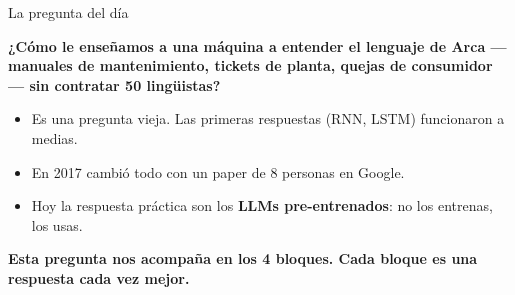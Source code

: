 \documentclass[aspectratio=169, 11pt]{beamer}
\begin{document}
\begin{frame}[shrink]{La pregunta del día}
  \vspace{14pt}
  \begin{center}
  \begin{tcolorbox}[colback=arcaDark, colframe=arcaDark, sharp corners,
    boxrule=0pt, left=14pt, right=14pt, top=10pt, bottom=10pt, width=0.92\textwidth]
    {\large\color{white}\bfseries
    ¿Cómo le enseñamos a una máquina a entender el lenguaje de Arca
    --- manuales de mantenimiento, tickets de planta, quejas de consumidor ---
    sin contratar 50 lingüistas?\par}
  \end{tcolorbox}
  \end{center}
  \vspace{14pt}
  \begin{itemize}\setlength{\itemsep}{4pt}
    \footnotesize
    \item Es una pregunta vieja. Las primeras respuestas (RNN, LSTM) funcionaron a medias.
    \item En 2017 cambió todo con un paper de 8 personas en Google.
    \item Hoy la respuesta práctica son los \textbf{LLMs pre-entrenados}: no los entrenas, los usas.
  \end{itemize}
  \vspace{6pt}
  \begin{tcolorbox}[colback=arcaRed!8, colframe=arcaRed, leftrule=3pt,
    boxrule=0pt, sharp corners, left=8pt, right=8pt, top=4pt, bottom=4pt]
    {\footnotesize\color{arcaDark}\bfseries
    Esta pregunta nos acompaña en los 4 bloques. Cada bloque es una respuesta cada vez mejor.}
  \end{tcolorbox}
\end{frame}
\end{document}
